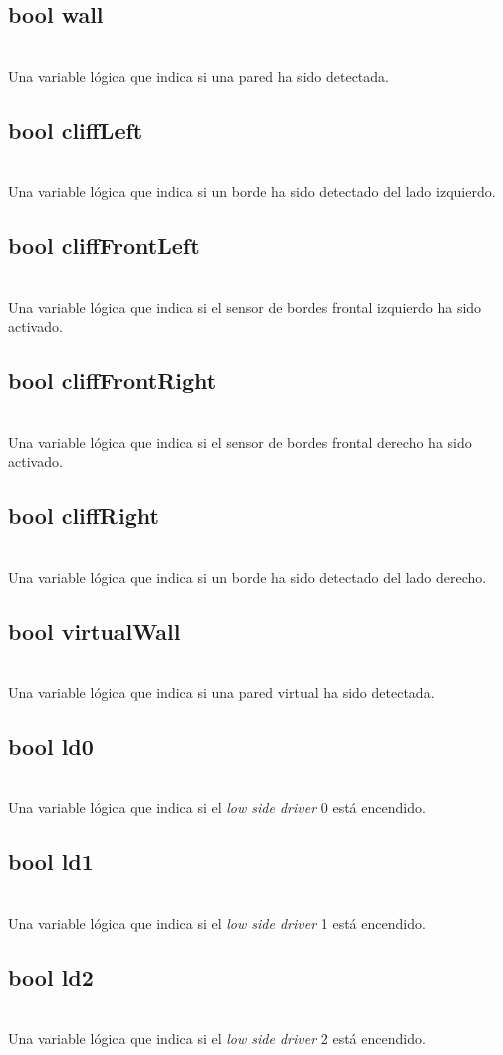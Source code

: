 \documentclass[letterpaper]{book}
\begin{document}
\subsection{bool wall}\mbox{}\\
Una variable lógica que indica si una pared ha sido detectada.
\subsection{bool cliffLeft}\mbox{}\\
Una variable lógica que indica si un borde ha sido detectado del lado izquierdo.
\subsection{bool cliffFrontLeft}\mbox{}\\
Una variable lógica que indica si el sensor de bordes frontal izquierdo ha sido activado.
\subsection{bool cliffFrontRight}\mbox{}\\
Una variable lógica que indica si el sensor de bordes frontal derecho ha sido activado.
\subsection{bool cliffRight}\mbox{}\\
Una variable lógica que indica si un borde ha sido detectado del lado derecho.
\subsection{bool virtualWall}\mbox{}\\
Una variable lógica que indica si una pared virtual ha sido detectada.
\subsection{bool ld0}\mbox{}\\
Una variable lógica que indica si el \emph{low side driver } 0 está encendido.
\subsection{bool ld1}\mbox{}\\
Una variable lógica que indica si el \emph{low side driver } 1 está encendido.
\subsection{bool ld2}\mbox{}\\
Una variable lógica que indica si el \emph{low side driver } 2 está encendido.
\end{document}
